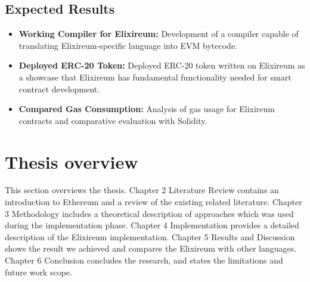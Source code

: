 \subsection{Expected Results}
\begin{itemize}
  \item \textbf{Working Compiler for Elixireum:} Development of a compiler capable of translating Elixireum-specific language into EVM bytecode.
  
  \item \textbf{Deployed ERC-20 Token:} Deployed ERC-20 token written on Elixireum as a showcase that Elixireum has fundamental functionality needed for smart contract development.
  
  \item \textbf{Compared Gas Consumption:} Analysis of gas usage for Elixireum contracts and comparative evaluation with Solidity.
\end{itemize}

\section{Thesis overview}
\label{sec:thesoverview}

This section overviews the thesis. Chapter 2 Literature Review contains an introduction to Ethereum and a review of the existing related literature. Chapter 3 Methodology includes a theoretical description of approaches which was used during the implementation phase. Chapter 4 Implementation provides a detailed description of the Elixireum implementation. Chapter 5 Results and Discussion shows the result we achieved and compares the Elixireum with other languages. Chapter 6 Conclusion concludes the research, and states the limitations and future work scope.


